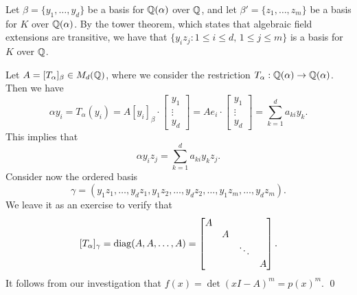 \begin{pf}
    Let $\beta = \{y_1, \dots, y_d\}$ be a basis for $\mathbb{Q}(\alpha)$ over $\mathbb{Q}$, 
    and let $\beta' = \{z_1, \dots, z_m\}$ be a basis for $K$ over $\mathbb{Q}(\alpha)$.
    By the tower theorem, which states that algebraic field extensions are 
    transitive, we have that $\{y_i z_j : 1 \leq i \leq d,\, 1 \leq j \leq m\}$ 
    is a basis for $K$ over $\mathbb{Q}$. 

    Let $A = [T_\alpha]_\beta \in M_d(\mathbb{Q})$, where we consider the 
    restriction $T_\alpha : \mathbb{Q}(\alpha) \to \mathbb{Q}(\alpha)$. Then we have 
    \[ \alpha y_i = T_\alpha(y_i) 
    = A[y_i]_\beta \cdot \begin{bmatrix} y_1 \\ \vdots \\ y_d \end{bmatrix} 
    = Ae_i \cdot \begin{bmatrix} y_1 \\ \vdots \\ y_d \end{bmatrix} 
    = \sum_{k=1}^d a_{ki} y_k. \]
    This implies that 
    \[ \alpha y_i z_j = \sum_{k=1}^d a_{ki} y_k z_j. \] 
    Consider now the ordered basis 
    \[ \gamma = (y_1z_1, \dots, y_dz_1, y_1z_2, \dots, y_dz_2, \dots, 
    y_1z_m, \dots, y_dz_m). \] 
    We leave it as an exercise to verify that 
    \[ [T_\alpha]_\gamma = \operatorname{diag}(A, A, \dots, A) = 
    \begin{bmatrix} A & & & \\ & A & & \\ & & \ddots & \\ & & & A \end{bmatrix}. \] 
    It follows from our investigation that $f(x) = \det(xI - A)^m = p(x)^m$. \qed
\end{pf}

